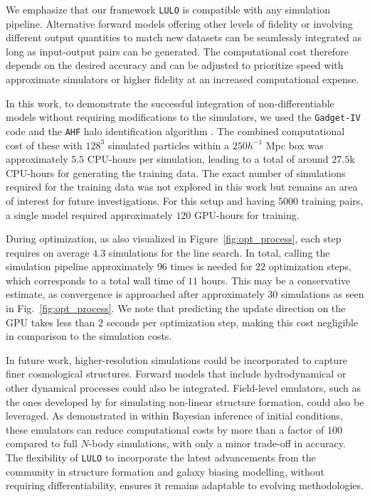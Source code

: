 We emphasize that our framework \texttt{LULO} is compatible with any simulation pipeline. Alternative forward models offering other levels of fidelity or involving different output quantities to match new datasets can be seamlessly integrated as long as input-output pairs can be generated. The computational cost therefore depends on the desired accuracy and can be adjusted to prioritize speed with approximate simulators or higher fidelity at an increased computational expense.

In this work, to demonstrate the successful integration of non-differentiable models without requiring modifications to the simulators, we used the \texttt{Gadget-IV} code \citep{Springel2021} and the \texttt{AHF} halo identification algorithm \citep{Gill2004, Knollmann2009}. The combined computational cost of these with $128^3$ simulated particles within a $250h^{-1}$ Mpc box was approximately $5.5$ CPU-hours per simulation, leading to a total of around $27.5$k CPU-hours for generating the training data. The exact number of simulations required for the training data was not explored in this work but remains an area of interest for future investigations. For this setup and having $5000$ training pairs, a single model required approximately $120$ GPU-hours for training.

During optimization, as also visualized in Figure~\ref{fig:opt_process}, each step requires on average $4.3$ simulations for the line search. In total, calling the simulation pipeline approximately $96$ times is needed for $22$ optimization steps, which corresponds to a total wall time of $11$ hours. This may be a conservative estimate, as convergence is approached after approximately $30$ simulations as seen in Fig.~\ref{fig:opt_process}. We note that predicting the update direction on the GPU takes less than $2$ seconds per optimization step, making this cost negligible in comparison to the simulation costs.

In future work, higher-resolution simulations could be incorporated to capture finer cosmological structures. Forward models that include hydrodynamical or other dynamical processes could also be integrated. Field-level emulators, such as the ones developed by \citet{Jamieson2022b,Jamieson2024} for simulating non-linear structure formation, could also be leveraged. As demonstrated in \citet{Doeser2024} within Bayesian inference of initial conditions, these emulators can reduce computational costs by more than a factor of $100$ compared to full $N$-body simulations, with only a minor trade-off in accuracy. The flexibility of \texttt{LULO} to incorporate the latest advancements from the community in structure formation and galaxy biasing modelling, without requiring differentiability, ensures it remains adaptable to evolving methodologies.

